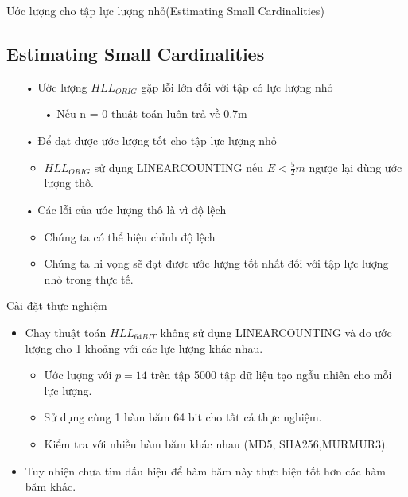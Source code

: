 \documentclass{beamer}
\newcommand{\bi}{\begin{itemize}}
\newcommand{\ei}{\end{itemize}}
\begin{document}
\begin{frame}{Ước lượng cho tập lực lượng nhỏ(Estimating Small Cardinalities)}
\subsection{Estimating Small Cardinalities}
\begin{itemize}
\item[•] Ước lượng $HLL_{ORIG}$ gặp lỗi lớn đối với tập có lực lượng nhỏ
\begin{itemize}
\item[•] Nếu n = 0 thuật toán luôn trả về 0.7m 
\end{itemize}
\item[•] Để đạt được ước lượng tốt cho tập lực lượng nhỏ
\begin{itemize}
\item $HLL_{ORIG}$ sử dụng LINEARCOUNTING nếu $E < \frac{5}{2}m$ ngược lại dùng ước lượng thô. 
\end{itemize}
\item[•] Các lỗi của ước lượng thô là vì độ lệch
\begin{itemize}
\item Chúng ta có thể hiệu chỉnh độ lệch
\item Chúng ta hi vọng sẽ đạt được ước lượng tốt nhất đối với tập lực lượng nhỏ trong thực tế.
\end{itemize}
\end{itemize}
\end{frame}
\begin{frame}{Cài đặt thực nghiệm}
\bi
\item Chay thuật toán $HLL_{64BIT}$ không sử dụng LINEARCOUNTING và đo ước lượng cho 1 khoảng với các lực lượng khác nhau.
\bi
\item Ước lượng với $p = 14$ trên tập 5000 tập dữ liệu tạo ngẫu nhiên cho mỗi lực lượng.
\item Sử dụng cùng 1 hàm băm 64 bit cho tất cả thực nghiệm.
\item Kiểm tra với nhiều hàm băm khác nhau (MD5, SHA256,MURMUR3).
\ei
\item Tuy nhiện chưa tìm dấu hiệu để hàm băm này thực hiện tốt hơn các hàm băm khác.
\ei
\end{frame}
\end{document}
